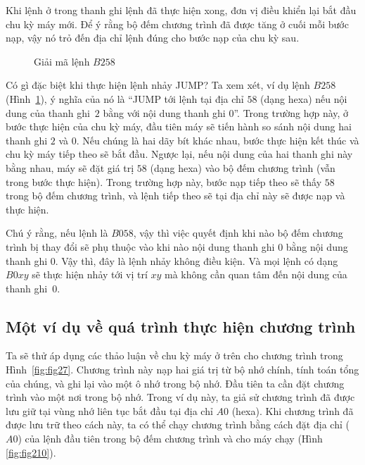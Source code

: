 Khi lệnh ở trong thanh ghi lệnh đã thực hiện xong, đơn vị điều khiển lại bắt đầu chu kỳ
máy mới. Để ý rằng bộ đếm chương trình đã được tăng ở cuối mỗi bước nạp, vậy nó trỏ đến
địa chỉ lệnh đúng cho bước nạp của chu kỳ sau.

\begin{figure}  
  \centering 
  \caption{Giải mã lệnh $B258$}
  \label{fig:fig29}
\end{figure}

Có gì đặc biệt khi thực hiện lệnh nhảy JUMP? Ta xem xét, ví dụ lệnh $B258$
(Hình~\ref{fig:fig29}), ý nghĩa của nó là ``JUMP tới lệnh tại địa chỉ $58$ (dạng hexa) nếu
nội dung của thanh ghi~$2$ bằng với nội dung thanh ghi $0$''. Trong trường hợp này, ở bước
thực hiện của chu kỳ máy, đầu tiên máy sẽ tiến hành so sánh nội dung hai thanh ghi $2$ và
$0$. Nếu chúng là hai dãy bít khác nhau, bước thực hiện kết thúc và chu kỳ máy tiếp theo
sẽ bắt đầu. Ngược lại, nếu nội dung của hai thanh ghi này bằng nhau, máy sẽ đặt giá trị
$58$ (dạng hexa) vào bộ đếm chương trình (vẫn trong bước thực hiện). Trong trường hợp này,
bước nạp tiếp theo sẽ thấy $58$ trong bộ đếm chương trình, và lệnh tiếp theo sẽ tại địa
chỉ này sẽ được nạp và thực hiện.

Chú ý rằng, nếu lệnh là $B058$, vậy thì việc quyết định khi nào bộ đếm chương trình bị
thay đổi sẽ phụ thuộc vào khi nào nội dung thanh ghi $0$ bằng nội dung thanh ghi $0$. Vậy
thì, đây là lệnh nhảy không điều kiện. Và mọi lệnh có dạng $B0xy$ sẽ thực hiện nhảy tới vị
trí $xy$ mà không cần quan tâm đến nội dung của thanh ghi~$0$.

\subsection*{Một ví dụ về quá trình thực hiện chương trình}
Ta sẽ thử áp dụng các thảo luận về chu kỳ máy ở trên cho chương trình trong
Hình~\ref{fig:fig27}. Chương trình này nạp hai giá trị từ bộ nhớ chính, tính toán tổng của
chúng, và ghi lại vào một ô nhớ trong bộ nhớ. Đầu tiên ta cần đặt chương trình vào một nơi
trong bộ nhớ. Trong ví dụ này, ta giả sử chương trình đã được lưu giữ tại vùng nhớ liên
tục bắt đầu tại địa chỉ $A0$ (hexa). Khi chương trình đã được lưu trữ theo cách này, ta có
thể chạy chương trình bằng cách đặt địa chỉ ($A0$) của lệnh đầu tiên trong bộ đếm chương
trình và cho máy chạy (Hình \ref{fig:fig210}).


